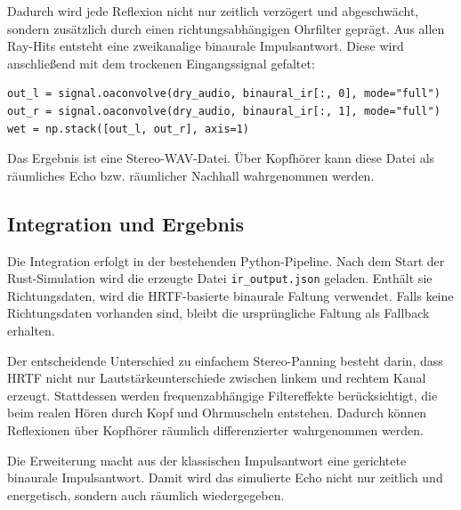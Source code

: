 Dadurch wird jede Reflexion nicht nur zeitlich verzögert und abgeschwächt, sondern zusätzlich durch einen richtungsabhängigen Ohrfilter geprägt. Aus allen Ray-Hits entsteht eine zweikanalige binaurale Impulsantwort. Diese wird anschließend mit dem trockenen Eingangssignal gefaltet:

\begin{lstlisting}
out_l = signal.oaconvolve(dry_audio, binaural_ir[:, 0], mode="full")
out_r = signal.oaconvolve(dry_audio, binaural_ir[:, 1], mode="full")
wet = np.stack([out_l, out_r], axis=1)
\end{lstlisting}

Das Ergebnis ist eine Stereo-WAV-Datei. Über Kopfhörer kann diese Datei als räumliches Echo bzw. räumlicher Nachhall wahrgenommen werden.

\subsection{Integration und Ergebnis}
\label{subsec:hrtf_integration_result}

Die Integration erfolgt in der bestehenden Python-Pipeline. Nach dem Start der Rust-Simulation wird die erzeugte Datei \texttt{ir\_output.json} geladen. Enthält sie Richtungsdaten, wird die HRTF-basierte binaurale Faltung verwendet. Falls keine Richtungsdaten vorhanden sind, bleibt die ursprüngliche Faltung als Fallback erhalten.

Der entscheidende Unterschied zu einfachem Stereo-Panning besteht darin, dass HRTF nicht nur Lautstärkeunterschiede zwischen linkem und rechtem Kanal erzeugt. Stattdessen werden frequenzabhängige Filtereffekte berücksichtigt, die beim realen Hören durch Kopf und Ohrmuscheln entstehen. Dadurch können Reflexionen über Kopfhörer räumlich differenzierter wahrgenommen werden.

Die Erweiterung macht aus der klassischen Impulsantwort eine gerichtete binaurale Impulsantwort. Damit wird das simulierte Echo nicht nur zeitlich und energetisch, sondern auch räumlich wiedergegeben.
